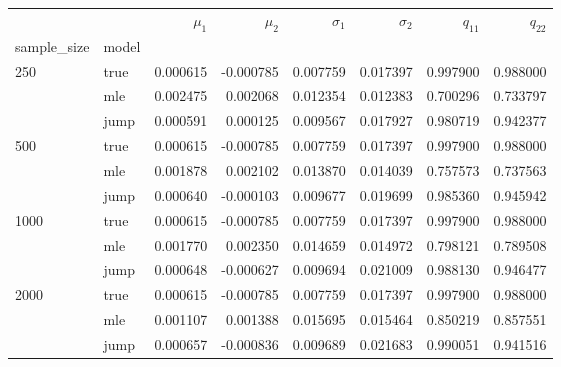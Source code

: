 \begin{tabular}{llrrrrrr}
\toprule
     &      &   $\mu_1$ &   $\mu_2$ &  $\sigma_1$ &  $\sigma_2$ &    $q_11$ &    $q_22$ \\
sample_size & model &           &           &             &             &           &           \\
\midrule
250  & true &  0.000615 & -0.000785 &    0.007759 &    0.017397 &  0.997900 &  0.988000 \\
     & mle &  0.002475 &  0.002068 &    0.012354 &    0.012383 &  0.700296 &  0.733797 \\
     & jump &  0.000591 &  0.000125 &    0.009567 &    0.017927 &  0.980719 &  0.942377 \\
500  & true &  0.000615 & -0.000785 &    0.007759 &    0.017397 &  0.997900 &  0.988000 \\
     & mle &  0.001878 &  0.002102 &    0.013870 &    0.014039 &  0.757573 &  0.737563 \\
     & jump &  0.000640 & -0.000103 &    0.009677 &    0.019699 &  0.985360 &  0.945942 \\
1000 & true &  0.000615 & -0.000785 &    0.007759 &    0.017397 &  0.997900 &  0.988000 \\
     & mle &  0.001770 &  0.002350 &    0.014659 &    0.014972 &  0.798121 &  0.789508 \\
     & jump &  0.000648 & -0.000627 &    0.009694 &    0.021009 &  0.988130 &  0.946477 \\
2000 & true &  0.000615 & -0.000785 &    0.007759 &    0.017397 &  0.997900 &  0.988000 \\
     & mle &  0.001107 &  0.001388 &    0.015695 &    0.015464 &  0.850219 &  0.857551 \\
     & jump &  0.000657 & -0.000836 &    0.009689 &    0.021683 &  0.990051 &  0.941516 \\
\bottomrule
\end{tabular}
